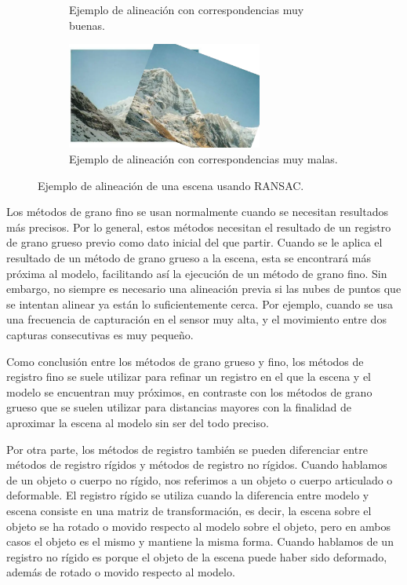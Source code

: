 \begin{figure}[h!]
\begin{subfigure}[t]{0.33\textheight}
        \caption{Ejemplo de alineación con correspondencias muy buenas.}
        \label{fig:ransac-ejemplo-alineado-bien}
    \end{subfigure}
    \begin{subfigure}[t]{0.33\textheight}
        \centering
        \includegraphics[height=3.5cm]{archivos/ransac-ejemplo-alineado-mal.png}
        \caption{Ejemplo de alineación con correspondencias muy malas.}
        \label{fig:ransac-ejemplo-alineado-mal}
    \end{subfigure}
    \caption{Ejemplo de alineación de una escena usando RANSAC.}
    \label{fig:ransac-ejemplo}
\end{figure}

Los métodos de grano fino se usan normalmente cuando se necesitan resultados más precisos.
Por lo general, estos métodos necesitan el resultado de un registro de grano grueso previo como dato inicial del que partir.
Cuando se le aplica el resultado de un método de grano grueso a la escena, esta se encontrará más próxima al modelo, facilitando así la ejecución de un método de grano fino.
Sin embargo, no siempre es necesario una alineación previa si las nubes de puntos que se intentan alinear ya están lo suficientemente cerca.
Por ejemplo, cuando se usa una frecuencia de capturación en el sensor muy alta, y el movimiento entre dos capturas consecutivas es muy pequeño. 

Como conclusión entre los métodos de grano grueso y fino, los métodos de registro fino se suele utilizar para refinar un registro en el
que la escena y el modelo se encuentran muy próximos, en contraste con los métodos de grano grueso que se suelen utilizar para distancias mayores con la finalidad de aproximar la escena al modelo sin ser del todo preciso.

Por otra parte, los métodos de registro también se pueden diferenciar entre métodos de registro rígidos y métodos de registro no rígidos.
Cuando hablamos de un objeto o cuerpo no rígido, nos referimos a un objeto o cuerpo articulado o deformable.
El registro rígido se utiliza cuando la diferencia entre modelo y escena consiste en una matriz de transformación, es decir, la escena sobre el objeto se ha rotado o movido respecto al modelo sobre el objeto, pero en ambos casos el objeto es el mismo y mantiene la misma forma.
Cuando hablamos de un registro no rígido es porque el objeto de la escena puede haber sido deformado, además de rotado o movido respecto al modelo.

